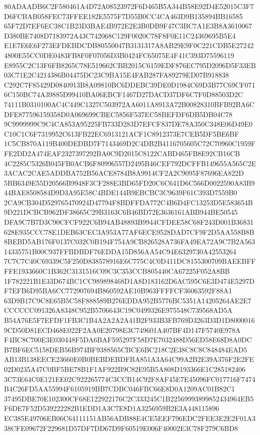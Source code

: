 \documentclass[UTF8,fontset=fandol,zihao=-4,a4paper]{ctexart}
\begin{document}
{{80ADAADB6C2F580461A4D72A08523972F6D465B5A344B58E92D4E52015C3F7D6FCBAB058FEC73FFEE182E5575F7D55B0CC4CA463D9B135894BB16585
65F72D7EF6EC38C1B23D3BAE4B972E2E3B0DB9F47C3BC7A1E3B8A3610067D380BE7408D7183972A43C742068C129F0020C78F8F0E11C24369695B5E4
E1E7E6E6F273EFDEBDCDB80550047B3131317A8AB29E9F0C221CDB5E272424800E55CC0DE0483FB8F0F07056D3B0424FC65075E4F41C393D75596119
E8955C2C13F6FB8265C78E519662CBB2015C6159EDF876EC795D2096D5F33EB03C71E2C4214386B04475DC23C9BA15E4FAB287FA89279ED07B918838
C292C7F85429D0840913B8A09810BC6DDEBC39DE0D1984C69D3B77C69CF0716C150BC74A39885D99410BA06EBCF1467D27DACD37DF6C7F0D88503D2C
74111B0310100AC4C449C1327C503972AA6011A8913A72B00828310BFB92BA6CDFE877596159358D0A069699CBEC5856F537EC58BEFDF6DB5DB04C78
9C9999999C9C4CA853A95225FB733D283D7EFCF837DE78A350C348E06D49E0C10C1C6F7319952C613FB22EC6913121ACF1C8912373E7CEB5DF5BE6BF
1C5CB870A119B400DEDBD7F7143469D2C4DB2B4116705605C72C70960C1959FFE2DD2A474EAF2327397292BA0C9D2015C8122CABD465FB8E92CB16CB
4C2285C5326B045FB0ACB6F80996557D2495B46CEF792DCFFB149655A565C2E3ACAC2CAE5ADDBA752B56ACE8784B8A9914CF2A2C9095F87696EA822D
5BB6349E55D20566B9948F3CF288E3BD65FD20C6C641D6C566D0022590A83B944BAE8508584D9D3A95E58C4BDE144B9EBCBC3C9639F61C393D7559B0
2CA9CB304D529765470924D47794F8BDFFDA772C4B6D4FC13253D5E583654B9D221DCBCB962DF38665C29B3163C6B46BD72E3636161ABB944BE50545
DFA9C7B7D3C90CFCF922C6B94AB48893B9944CFDEE58C68F243D001B36831628E935CCC78E1DEB63CEC3A953A77AF6ECE9528DAD7CF9F2D5AA558B8B
8BEBD5AB176F0137C032C0B194F754A9CB826528A736FA49EA72A9C7B2A56314335751B00C937FFBDBDF76EDDA15D856AA54C94E6329730A42553264
7C7C7C40C69339C5F250D838578916E6C775C4C0D411DC8155300709BAEEBFFFFE1933660C1B362C3131516C09C3C353CCB805440CA67225F052A8BB
1F782221B1E33D674BC1CC989898468D1A8D183162D6AC595C6E3D474E5297DF7EFB6D95BA6CC772907694B860592AE10B963FFFFCF36063592F88A1
63D9B17C9C8E65B5C58F888589B276EDDA952B5776BC5351A14205264AE2E7CCCCCC091326A8348C952B5706643C19C0499326E975548C739568AD5A
B54A76E5F7EFDF1FB3C1B4A2A2A2A41B2F933B3FB769D3263D3D1D80000169CD50D81ECD468E022F2AA0E20798E3C749601A407BF4D147F5740E978A
F4BC8C700E3E030448F5DA6BAF595297F58D7E7032488D56ED58E68D8A0DCB7BF6EC5158DEB56B974BF9388565CBCE6BC218C2E38C8C8C848484EAD5
AB13B138EECE23660E0B0BEBDEBDFBA851A3A64C99A2B2E39A376F2E2FE02D0235A47C0BF5BE78B1F1AF922B9C82E95B5A808D193366E1C285182406
3C73E64C0E121EE02C922265774C3CCB14C92F8AF45E7E45096FC017716F7474B4C26FD5AA55994F6105919BB7CDBC046FBC66E8D0A1209AC01B82C1
37495DBE70E102300CF68E122922176C2C333245C1B22569993899852434964EB5F6DE7F52D539222282B1EDD1A3C7E8D1A3256959B2E3A448115896
EC385E49706EB06C64111151AB56ADB88E4CE5EEF796EDC2FEE3E2E2F01A338CFE09672F229681D57DF7DD67D9F60519E006F40002E3C78F279C6BD8
}}
\end{document}

